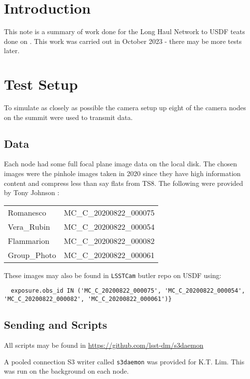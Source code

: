 
\section{Introduction}

This note is a summary of work done for the Long Haul Network to USDF teats done on .
This work was carried out in October 2023 - there may be more tests later.

\section {Test Setup}

To simulate as closely as possible the camera setup up eight of the camera nodes on the summit
were used to transmit data.

\subsection{Data}
Each node had some full focal plane image data on the local disk.
The chosen images were the pinhole images taken in 2020 since they have high information content and compress less than say flats from TS8.
The following  were provided by Tony Johnson :\\
\begin{tabular}{l l}
Romanesco  & MC\_C\_20200822\_000075\\
Vera\_Rubin & MC\_C\_20200822\_000054\\
Flammarion & MC\_C\_20200822\_000082\\
Group\_Photo & MC\_C\_20200822\_000061\\
\end{tabular}

These images may also be found in {\tt LSSTCam}  butler repo on USDF  using:
\begin{verbatim}
  exposure.obs_id IN ('MC_C_20200822_000075', 'MC_C_20200822_000054', 'MC_C_20200822_000082', 'MC_C_20200822_000061')}
\end{verbatim}

\subsection{Sending  and Scripts}

All scripts may be found in \url{https://github.com/lsst-dm/s3daemon}

A pooled connection S3 writer called {\tt s3daemon} was provided for K.T. Lim.
This was run on the background on each node.

